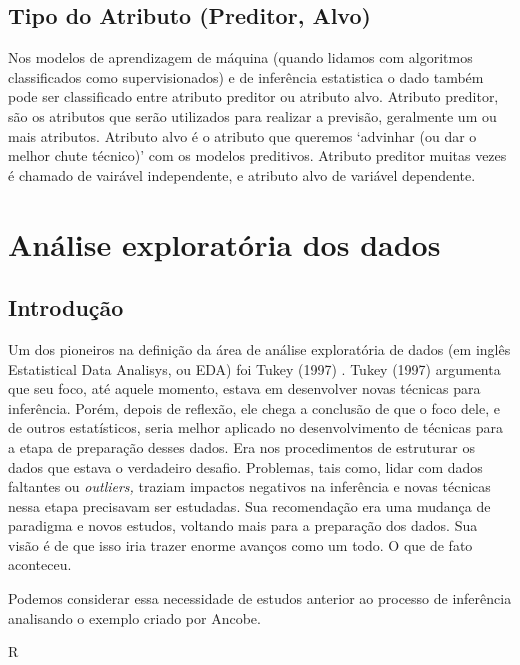 \documentclass[
]{book}
\begin{document}
\section{Tipo do Atributo (Preditor, Alvo)}\label{tipo-do-atributo-preditor-alvo}

Nos modelos de aprendizagem de máquina (quando lidamos com algoritmos classificados como supervisionados) e de inferência estatistica o dado também pode ser classificado entre atributo preditor ou atributo alvo. Atributo preditor, são os atributos que serão utilizados para realizar a previsão, geralmente um ou mais atributos. Atributo alvo é o atributo que queremos `advinhar (ou dar o melhor chute técnico)' com os modelos preditivos. Atributo preditor muitas vezes é chamado de vairável independente, e atributo alvo de variável dependente.

\chapter{Análise exploratória dos dados}\label{anuxe1lise-exploratuxf3ria-dos-dados}

\section{Introdução}\label{introduuxe7uxe3o-1}

Um dos pioneiros na definição da área de análise exploratória de dados (em inglês Estatistical Data Analisys, ou EDA) foi Tukey (1997) \citep{tukey1977exploratory}. Tukey (1997) argumenta que seu foco, até aquele momento, estava em desenvolver novas técnicas para inferência. Porém, depois de reflexão, ele chega a conclusão de que o foco dele, e de outros estatísticos, seria melhor aplicado no desenvolvimento de técnicas para a etapa de preparação desses dados. Era nos procedimentos de estruturar os dados que estava o verdadeiro desafio. Problemas, tais como, lidar com dados faltantes ou \emph{outliers,} traziam impactos negativos na inferência e novas técnicas nessa etapa precisavam ser estudadas. Sua recomendação era uma mudança de paradigma e novos estudos, voltando mais para a preparação dos dados. Sua visão é de que isso iria trazer enorme avanços como um todo. O que de fato aconteceu.

Podemos considerar essa necessidade de estudos anterior ao processo de inferência analisando o exemplo criado por Ancobe.

R
\end{document}
